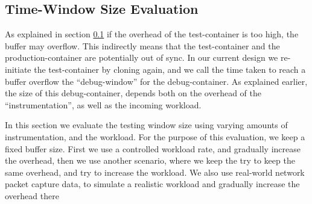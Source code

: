 \subsection{Time-Window Size Evaluation}
\label{sec:timewindowPerformance}

As explained in section \ref{sec:timewindowPerformance} if the overhead of the test-container is too high, the buffer may overflow.
This indirectly means that the test-container and the production-container are potentially out of sync.
In our current design we re-initiate the test-container by cloning again, and we call the time taken to reach a buffer overflow the ``debug-window'' for the debug-container.
As explained earlier, the size of this debug-container, depends both on the overhead of the ``instrumentation'', as well as the incoming workload.

In this section we evaluate the testing window size using varying amounts of instrumentation, and the workload.
For the purpose of this evaluation, we keep a fixed buffer size. 
First we use a controlled workload rate, and gradually increase the overhead, then we use another scenario, where we keep the try to keep the same overhead, and try to increase the workload.
We also use real-world network packet capture data, to simulate a realistic workload and gradually increase the overhead there

	
